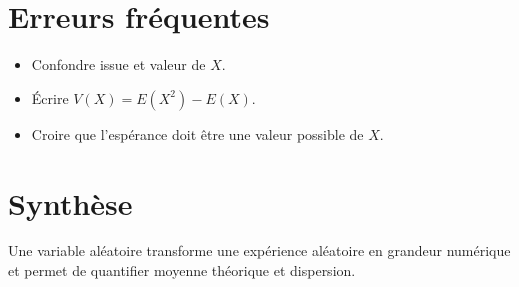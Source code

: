 \section{Erreurs fréquentes}
\begin{itemize}
\item Confondre issue et valeur de $X$.
\item Écrire $V(X)=E(X^2)-E(X)$.
\item Croire que l’espérance doit être une valeur possible de $X$.
\end{itemize}

\section{Synthèse}
Une variable aléatoire transforme une expérience aléatoire en grandeur numérique et permet de quantifier moyenne théorique et dispersion.
